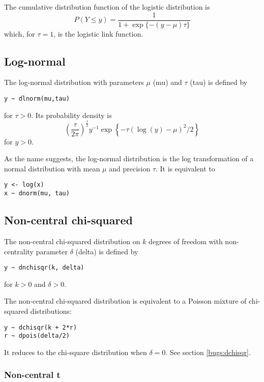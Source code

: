 \documentclass[11pt, a4paper, titlepage]{report}
\begin{document}
The cumulative distribution function of the logistic distribution is
\[
P(Y \leq y) = \frac{1}{\textstyle  1 + \exp\{ - (y - \mu) \tau\}}
\]
which, for $\tau = 1$, is the logistic link function.

\subsection{Log-normal}
\label{bugs:dlnorm}

The log-normal distribution with parameters $\mu$ (mu) and $\tau$ (tau) is
defined by
\begin{verbatim}
y ~ dlnorm(mu,tau)
\end{verbatim}
for $\tau > 0$. Its probability density is
\[
\left(
\frac{\tau}{2\pi}
\right)^{\frac{1}{2}} y^{-1} \exp \left\{-\tau (\log(y) - \mu)^2 / 2 \right\}
\]
for $y > 0$.

As the name suggests, the log-normal distribution is the log transformation
of a normal distribution with mean $\mu$ and precision $\tau$. It is
equivalent to
\begin{verbatim}
y <- log(x)
x ~ dnorm(mu, tau)
\end{verbatim}

\subsection{Non-central chi-squared}
\label{bugs:dnchisqr}

The non-central chi-squared distribution on $k$ degrees of freedom with
non-centrality parameter $\delta$ (delta) is defined by
\begin{verbatim}
y ~ dnchisqr(k, delta)
\end{verbatim}
for $k > 0$ and $\delta > 0$.

The non-central chi-squared distribution is equivalent to a Poisson
mixture of chi-squared distributions:
\begin{verbatim}
y ~ dchisqr(k + 2*r)
r ~ dpois(delta/2)
\end{verbatim}
It reduces to the chi-square distribution when $\delta = 0$. See
section \ref{bugs:dchisqr}.

\subsubsection{Non-central t}
\label{bugs:dnt}
\end{document}
